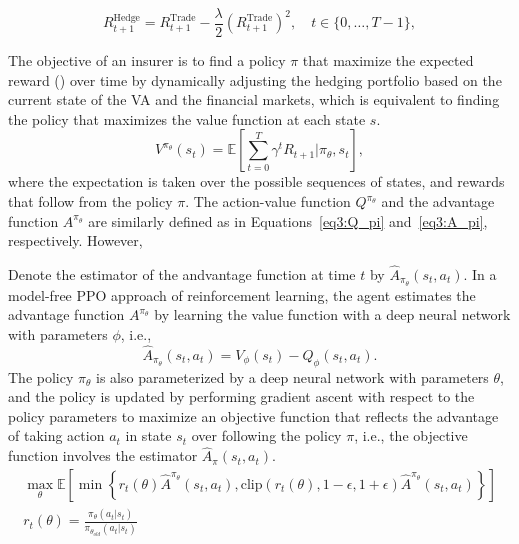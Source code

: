 \begin{equation} \label{eq3:rewardHedging}
    R_{t+1}^{\text{Hedge}} = R_{t+1}^{\text{Trade}} - \frac{\lambda}{2}(R_{t+1}^{\text{Trade}})^2, \quad t \in \{0,\ldots,T-1\},
\end{equation}

The objective of an insurer is to find a policy $\pi$ that maximize the expected reward () over time by dynamically adjusting the hedging portfolio based on the current state of the VA and the financial markets, which is equivalent to finding the policy that maximizes the value function at each state $s$.
\begin{equation}
    V^{\pi_{\theta}}(s_t) = \mathbb{E}\left[\sum_{t=0}^{T} \gamma^t R_{t+1} | \pi_{\theta}, s_t\right],
\end{equation}
where the expectation is taken over the possible sequences of states, and rewards that follow from the policy $\pi$.
The action-value function $Q^{\pi_{\theta}}$ and the advantage function $A^{\pi_{\theta}}$ are similarly defined as in Equations~\ref{eq3:Q_pi} and~\ref{eq3:A_pi}, respectively.
However, 

Denote the estimator of the andvantage function at time $t$ by $\hat{A}_{\pi_{\theta}}(s_t, a_t)$.
In a model-free PPO approach of reinforcement learning, the agent estimates the advantage function $A^{\pi_{\theta}}$ by learning the value function with a deep neural network with parameters $\phi$, i.e.,
\begin{equation}
    \hat{A}_{\pi_{\theta}}(s_t, a_t) = V_{\phi}(s_t) - Q_{\phi}(s_t, a_t).
\end{equation}
The policy $\pi_\theta$ is also parameterized by a deep neural network with parameters $\theta$, and the policy is updated by performing gradient ascent with respect to the policy parameters to maximize an objective function that reflects the advantage of taking action $a_t$ in state $s_t$ over following the policy $\pi$, i.e., the objective function involves the estimator $\hat{A}_{\pi}(s_t, a_t)$.
\begin{align}
    \max_{\theta} \mathbb{E}\left[ \min \left\{ r_t(\theta)\hat{A}^{\pi_{\theta}}(s_t, a_t), \text{clip}(r_t(\theta), 1-\epsilon, 1 + \epsilon) \hat{A}^{\pi_{\theta}}(s_t, a_t)  \right\} \right] \\
    r_t(\theta) = \frac{\pi_{\theta}(a_t|s_t)}{\pi_{\theta_{old}}(a_t|s_t)} 
\end{align}

